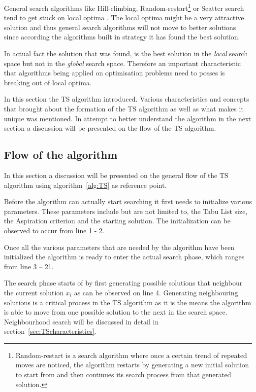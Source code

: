 General search algorithms like Hill-climbing, Random-restart\footnote{Random-restart is a search algorithm where once a certain trend of repeated moves are noticed, the algorithm restarts by generating a new initial solution to start from and then continues its search process from that generated solution\cite{AIModernApproach}.} or Scatter search tend to get stuck on local optima \cite{AIModernApproach}. The local optima might be a very attractive solution and thus general search algorithms will not move to better solutions since according the algorithms built in strategy it has found the best solution. 

In actual fact the solution that was found, is the best solution in the \emph{local} search space but not in the \emph{global} search space\cite{CompuIntelligenceIntro,AIModernApproach}. Therefore an important characteristic that algorithms being applied on optimisation problems need to posses is breaking out of local optima\cite{CompuIntelligenceIntro,AIModernApproach}.

In this section the TS algorithm introduced. Various characteristics and concepts that brought about the formation of the TS algorithm as well as what makes it unique was mentioned. In attempt to better understand the algorithm in the next section a discussion will be presented on the flow of the TS algorithm.
\subsection{Flow of the algorithm}
In this section a discussion will be presented on the general flow of the TS algorithm using algorithm~\ref{alg:TS} as reference point.

Before the algorithm can actually start searching it first needs to initialize various parameters. These parameters include but are not limited to, the Tabu List size, the Aspiration criterion and the starting solution. The initialization can be observed to occur from line 1 - 2.

Once all the various parameters that are needed by the algorithm have been initialized the algorithm is ready to enter the actual search phase, which ranges from line 3 -- 21. 

The search phase starts of by first generating possible solutions that neighbour the current solution $x_i$ as can be observed on line 4. Generating neighbouring solutions is a critical process in the TS algorithm as it is the means the algorithm is able to move from one possible solution to the next in the search space. Neighbourhood search will be discussed in detail in section~\ref{sec:TScharacteristics}.

